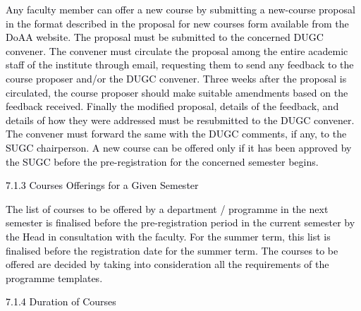 \documentclass[12pt]{article}
\begin{document}
\vspace{\baselineskip}
\begin{justify}
{\fontsize{9pt}{10.8pt}\selectfont \textcolor[HTML]{00000A}{Any faculty member can offer a new course by submitting a new-course proposal in the format described in the proposal for new courses form available from the DoAA website. The proposal must be submitted to the concerned DUGC convener. The convener must circulate the proposal among the entire academic staff of the institute through email, requesting them to send any feedback to the course proposer and/or the DUGC convener. Three weeks after the proposal is circulated, the course proposer should make suitable amendments based on the feedback received. Finally the modified proposal, details of the feedback, and details of how they were addressed must be resubmitted to the DUGC convener. The convener must forward the same with the DUGC comments, if any, to the SUGC chairperson. A new course can be offered only if it has been approved by the SUGC before the pre-registration for the concerned semester begins.}\par}
\end{justify}\par


\vspace{\baselineskip}
{\fontsize{10pt}{12.0pt}\selectfont \textcolor[HTML]{00000A}{7.1.3 Courses Offerings for a Given Semester}\par}\par


\vspace{\baselineskip}
\begin{justify}
{\fontsize{10pt}{12.0pt}\selectfont \textcolor[HTML]{00000A}{The list of courses to be offered by a department / programme in the next semester is finalised before the pre-registration period in the current semester by the Head in consultation with the faculty. For the summer term, this list is finalised before the registration date for the summer term. The courses to be offered are decided by taking into consideration all the requirements of the programme templates.}\par}
\end{justify}\par


\vspace{\baselineskip}
{\fontsize{10pt}{12.0pt}\selectfont \textcolor[HTML]{00000A}{7.1.4 Duration of Courses}\par}\par
\end{document}
